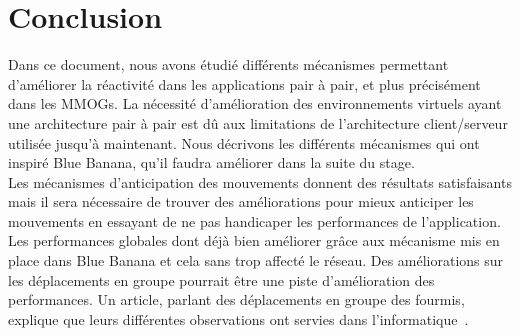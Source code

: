 \section{Conclusion}
	Dans ce document, nous avons étudié différents mécanismes permettant d'améliorer la réactivité dans les applications pair à pair, et plus précisément dans les MMOGs. La nécessité d'amélioration des environnements virtuels ayant une architecture pair à pair est dû aux limitations de l'architecture client/serveur utilisée jusqu'à maintenant. Nous décrivons les différents mécanismes qui ont inspiré Blue Banana, qu'il faudra améliorer dans la suite du stage.\\
	Les mécanismes d'anticipation des mouvements donnent des résultats satisfaisants mais il sera nécessaire de trouver des améliorations pour mieux anticiper les mouvements en essayant de ne pas handicaper les performances de l'application. Les performances globales dont déjà bien améliorer grâce aux mécanisme mis en place dans Blue Banana et cela sans trop affecté le réseau. Des améliorations sur les déplacements en groupe pourrait être une piste d'amélioration des performances. Un  article, parlant des déplacements en groupe des fourmis, explique que leurs différentes observations ont servies dans l'informatique~\cite{fourmis}. 
		
